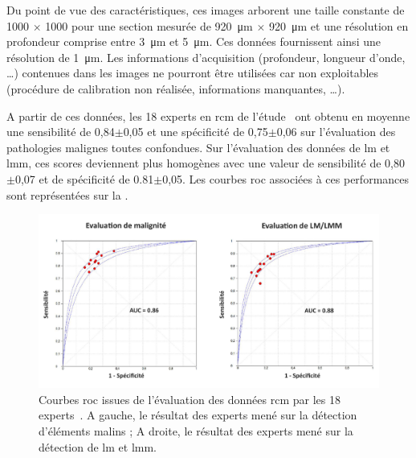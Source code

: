 Du point de vue des caractéristiques, ces images arborent une taille constante de \SI{1000}{\px} $\times$ \SI{1000}{\px} pour une section mesurée de \SI{920}{\micro\metre} $\times$ \SI{920}{\micro\metre} et une résolution en profondeur comprise entre \SI{3}{\micro\metre} et \SI{5}{\micro\metre}. Ces données fournissent ainsi une résolution de \SI{1}{\micro\metre}. Les informations d'acquisition (profondeur, longueur d'onde, \ldots) contenues dans les images ne pourront être utilisées car non exploitables (procédure de calibration non réalisée, informations manquantes, \ldots).\par
\clearpage

A partir de ces données, les 18 experts en \gls{rcm} de l'étude~\cite{Cinotti2018} ont obtenu en moyenne une sensibilité de 0,84$\pm$0,05 et une spécificité de 0,75$\pm$0,06 sur l'évaluation des pathologies malignes toutes confondues. Sur l'évaluation des données de \gls{lm} et \gls{lmm}, ces scores deviennent plus homogènes avec une valeur de sensibilité de 0,80$\pm$0,07 et de spécificité de 0.81$\pm$0,05. Les courbes \gls{roc} associées à ces performances sont représentées sur la .\par

\begin{figure}[H]
    \begin{center}
        \includegraphics[width=\linewidth]{contents/ii_preamble_microscopy/resources/results_roc_rcm_experts.pdf}
        \caption{Courbes \gls{roc} issues de l'évaluation des données \gls{rcm} par les 18 experts~\cite{Cinotti2018}. A gauche, le résultat des experts mené sur la détection d'éléments malins ; A droite, le résultat des experts mené sur la détection de \gls{lm} et \gls{lmm}.}
        \label{fig:results_roc_rcm_experts}
    \end{center} 
\end{figure}\par

